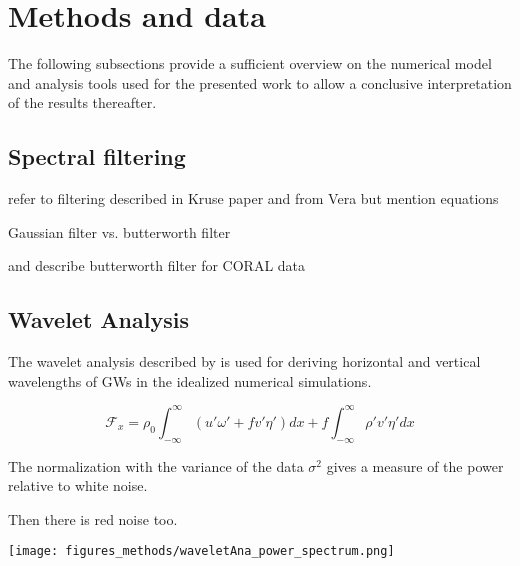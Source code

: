 \chapter{Methods and data}
\label{sec:methods}
The following subsections provide a sufficient overview on the numerical model and analysis tools used for the presented work to allow a conclusive interpretation of the results thereafter.

\section{Spectral filtering}
\label{sec:spectral_filter}

refer to filtering described in Kruse paper and from Vera
but mention equations

Gaussian filter vs. butterworth filter

and describe butterworth filter for CORAL data

\section{Wavelet Analysis}
\label{sec:wavelet}
The wavelet analysis described by \textcite{torrence_practical_1998} is used for deriving horizontal and vertical wavelengths of GWs in the idealized numerical simulations. 





\begin{equation}
    \mathcal{F}_x =  \rho_0 \int_{-\infty}^{\infty} (u'\omega' + f v' \eta') dx + f \int_{-\infty}^{\infty} \rho' v' \eta' dx
    \label{equ:morlet}
\end{equation}

The normalization with the variance of the data $\sigma^2$ gives a measure of the power relative to white noise. 

Then there is red noise too.


\begin{figure*}[tbp]
    \centering
    \texttt{[image: figures\_methods/waveletAna\_power\_spectrum.png]}
    \caption{}
    \label{fig:wavelet_example}
\end{figure*}



